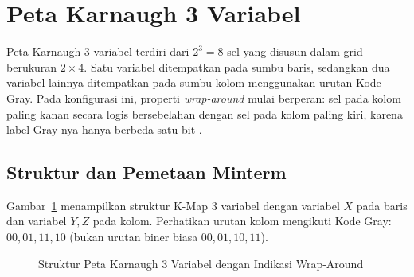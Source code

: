 \section{Peta Karnaugh 3 Variabel}

Peta Karnaugh 3 variabel terdiri dari $2^3 = 8$ sel yang disusun dalam grid berukuran $2 \times 4$. Satu variabel ditempatkan pada sumbu baris, sedangkan dua variabel lainnya ditempatkan pada sumbu kolom menggunakan urutan Kode Gray. Pada konfigurasi ini, properti \textit{wrap-around} mulai berperan: sel pada kolom paling kanan secara logis bersebelahan dengan sel pada kolom paling kiri, karena label Gray-nya hanya berbeda satu bit \cite{rosen2019}.

\subsection{Struktur dan Pemetaan Minterm}

Gambar~\ref{fig:kmap-3var} menampilkan struktur K-Map 3 variabel dengan variabel $X$ pada baris dan variabel $Y, Z$ pada kolom. Perhatikan urutan kolom mengikuti Kode Gray: $00, 01, 11, 10$ (bukan urutan biner biasa $00, 01, 10, 11$).

\begin{figure}[H]
\centering
{}
\caption{Struktur Peta Karnaugh 3 Variabel dengan Indikasi Wrap-Around}
\label{fig:kmap-3var}
\end{figure}

